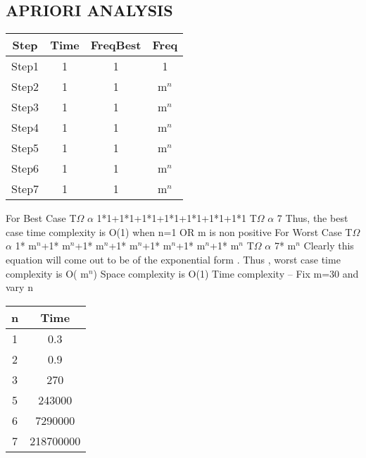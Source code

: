 \documentclass[conference]{IEEEtran}
\begin{document}
\subsection{APRIORI ANALYSIS }
\begin{center}
   \begin{tabular}{|c|c|c|c}
   \hline
   Step&Time&FreqBest&Freq \\
   \hline\hline
   Step1 & 1 & 1 &  1 \\
    \hline
   Step2 & 1 & 1 &  m$^{n}$\\
    \hline
   Step3 & 1 & 1 &  m$^{n}$\\
    \hline
   Step4 & 1 & 1 &  m$^{n}$\\
    \hline
  Step5 & 1 & 1 &  m$^{n}$\\
  \hline
  Step6 & 1 & 1 &  m$^{n}$\\
    \hline
    Step7 & 1 & 1 &  m$^{n}$ \\
    \hline
    \end{tabular} 
\end{center}
For Best Case
\newline
T$\Omega$ $\alpha$ 1*1+1*1+1*1+1*1+1*1+1*1+1*1
\newline
T$\Omega$ $\alpha$ 7
\newline
Thus, the best case time complexity is O(1) when n=1 OR m is non positive
\newline
For Worst Case
\newline
T$\Omega$ $\alpha$ 1*  m$^{n}$+1* m$^{n}$+1* m$^{n}$+1* m$^{n}$+1* m$^{n}$+1*  m$^{n}$+1* m$^{n}$
\newline
T$\Omega$ $\alpha$ 7* m$^{n}$
\newline
Clearly this equation will come out to be of the exponential form .
\newline
Thus , worst case time complexity is O( m$^{n}$)
\newline
Space complexity is O(1)
\newline
Time complexity –
\newline
Fix m=30 and vary n
\newline
\begin{center}
   \begin{tabular}{|c|c|}
   \hline
   n & Time \\
   \hline\hline
    1 & 0.3 \\
    \hline
    2 & 0.9 \\
    \hline
    3 & 270 \\
    \hline
    5 & 243000 \\
    \hline
    6 & 7290000 \\
    \hline
    7 & 218700000 \\
    \hline
    \end{tabular} 
\end{center}
\end{document}
